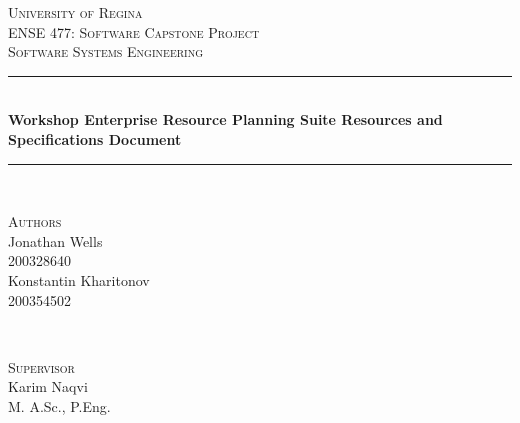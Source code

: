 \begin{titlepage} %
	\newcommand{\HRule}{\rule{\linewidth}{0.5mm}} %
	
	\center %
	
	
	\textsc{\Huge University of Regina}\\[1.5cm] %

	\textsc{\Large ENSE 477: Software Capstone Project}\\[0.5cm]
	
	\textsc{\Large Software Systems Engineering}\\[0.5cm] %
	
	
	
	
	
	\HRule\\[0.4cm]
	
	{\Huge\bfseries Workshop Enterprise Resource Planning Suite Resources and Specifications Document}\\[0.4cm] %
	
	\HRule\\[1.5cm]
	
	
	\begin{minipage}[t]{0.4\textwidth}
		\begin{flushleft}
			\large
			\textsc{Authors}\\
			Jonathan Wells\\
			\textsc{200328640}\\ %
			\large
			Konstantin Kharitonov\\
			\textsc{200354502} %
		\end{flushleft}
		
	\end{minipage}
	~
	\begin{minipage}[t]{0.4\textwidth}
		\begin{flushright}
			\large
			\textsc{Supervisor}\\ %
			Karim Naqvi\\
			M. A.Sc., P.Eng.\\
		\end{flushright}
	\end{minipage}
	

\end{titlepage}
